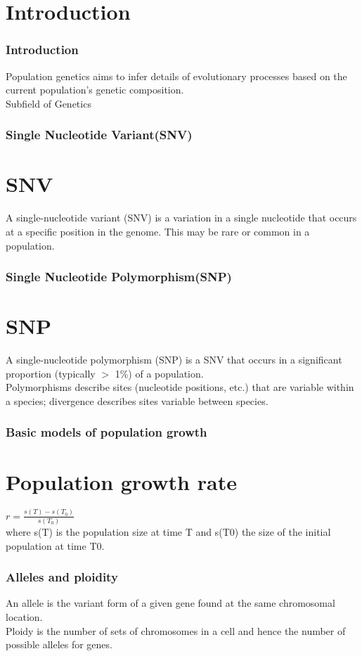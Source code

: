 \documentclass{beamer}
\begin{document}
    \section{Introduction}
        \begin{frame}
            \frametitle{Introduction}
            Population genetics aims to infer details of evolutionary processes based on the current population's genetic composition. \\
            Subfield of Genetics 
        \end{frame}

    \begin{frame}
        \frametitle{Single Nucleotide Variant(SNV)}
        \section{SNV}
        A single-nucleotide variant (SNV) is a variation in a single nucleotide that occurs at a specific position in the genome. This may be rare or common in a population. \\
    \end{frame}
    \begin{frame}
        \frametitle{Single Nucleotide Polymorphism(SNP)}
        \section{SNP}
        A single-nucleotide polymorphism (SNP) is a SNV that occurs in a significant proportion (typically $>$ 1\%) of a population. \\
        Polymorphisms describe sites (nucleotide positions, etc.) that are variable within a species; divergence describes sites variable between species.
        
    
    \end{frame}
    \begin{frame}
        \frametitle{Basic models of population growth}
        \section*{Population growth rate}
        $r = \frac{s(T)-s(T_0)}{s(T_0)}$ \\
        where s(T) is the population size at time T and s(T0) the size of the initial population at time T0. 
    \end{frame}
    \begin{frame}
        \frametitle{Alleles and ploidity}
        
        An allele is the variant form of a given gene found at the same chromosomal location.
        \\
        Ploidy is the number of sets of chromosomes in a cell and hence the number of possible alleles for genes.
    
        
    
    \end{frame}
\end{document}
